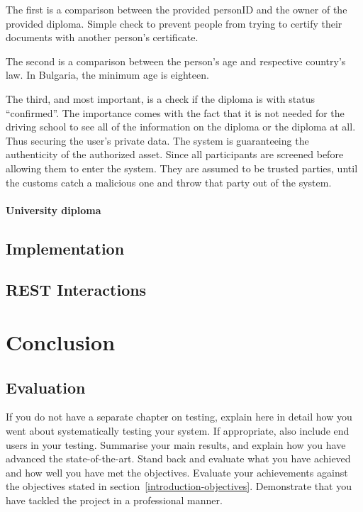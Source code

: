 \documentclass[a4paper,11pt]{report}
\begin{document}
	The first is a comparison between the provided personID and the owner of the provided diploma. Simple check to prevent people from trying to certify their documents with another person’s certificate.
	
	The second is a comparison between the person’s age and respective country’s law. In Bulgaria, the minimum age is eighteen. 
	
	The third, and most important, is a check if the diploma is with status “confirmed”. The importance comes with the fact that it is not needed for the driving school to see all of the information on the diploma or the diploma at all. Thus securing the user’s private data. The system is guaranteeing the authenticity of the authorized asset. Since all participants are screened before allowing them to enter the system. They are assumed to be trusted parties, until the customs catch a malicious one and throw that party out of the system. 


\subsubsection{University diploma}

\section{Implementation}
\section{REST Interactions}


\chapter{Conclusion}

\label{conclusion}

\section{Evaluation}

\label{conclusion-evaluation}

If you do not have a separate chapter on testing, explain here in detail how you
went about systematically testing your system. If appropriate, also include
end users in your testing. Summarise your main results, and explain how you have
advanced the state-of-the-art. Stand back and evaluate what you have achieved
and how well you have met the objectives. Evaluate your achievements against the
objectives stated in section~\ref{introduction-objectives}. Demonstrate that you
have tackled the project in a professional manner.
\end{document}
